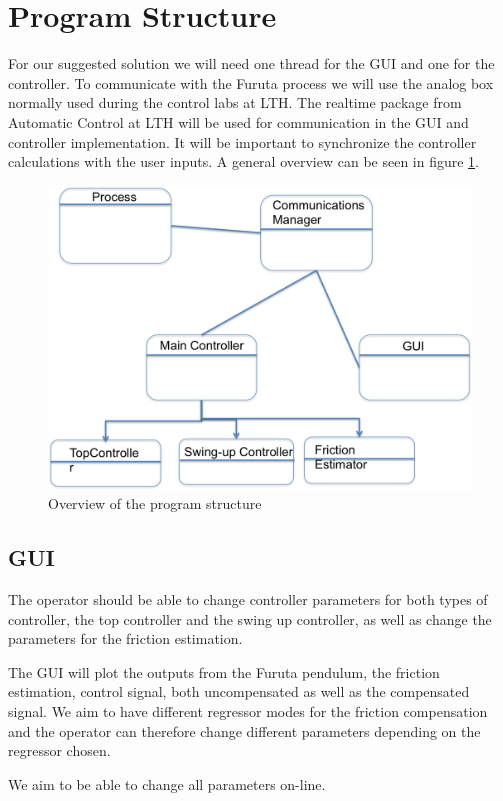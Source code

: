 \documentclass[10pt,a4paper]{article}
\begin{document}
\section{Program Structure}
For our suggested solution we will need one thread for the GUI and one for the controller. To communicate with the Furuta process we will use the analog box normally used during the control labs at LTH. The realtime package from Automatic Control at LTH will be used for communication in the GUI and controller implementation. It will be important to synchronize the controller calculations with the user inputs. A general overview can be seen in figure \ref{fig:uml}.
\begin{figure}[H]
\centerline{\includegraphics[scale=0.7]{umlfuruta.png}}
\caption{Overview of the program structure}
\label{fig:uml}
\end{figure}
\subsection{GUI}
The operator should be able to change controller parameters for both types of controller, the top controller and the swing up controller, as well as change the parameters for the friction estimation. 

The GUI will plot the outputs from the Furuta pendulum, the friction estimation, control signal, both uncompensated as well as the compensated signal. We aim to have different regressor modes for the friction compensation and the operator can therefore change different parameters depending on the regressor chosen. 

We aim to be able to change all parameters on-line.
\end{document}
